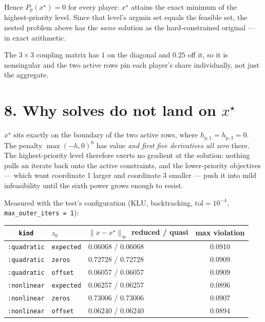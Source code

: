 \documentclass[11pt]{article}
\begin{document}
Hence \(P_p(x^\star) = 0\) for every player: \(x^\star\) attains the exact minimum of the
highest-priority level. Since that level's argmin set equals the feasible set, the nested
problem above has the \emph{same} solution as the hard-constrained original --- in exact
arithmetic.

The \(3\times 3\) coupling matrix has \(1\) on the diagonal and \(0.25\) off it, so it is
nonsingular and the two active rows pin each player's share individually, not just the
aggregate.

\section*{8. Why solves do not land on \texorpdfstring{\(x^\star\)}{x*}}

\(x^\star\) sits exactly on the boundary of the two active rows, where
\(h_{p,1} = h_{p,3} = 0\). The penalty \(\max(-h,0)^6\) has value \emph{and first five
derivatives all zero} there. The highest-priority level therefore exerts no gradient at the
solution: nothing pulls an iterate back onto the active constraints, and the lower-priority
objectives --- which want coordinate 1 larger and coordinate 3 smaller --- push it into mild
infeasibility until the sixth power grows enough to resist.

Measured with the test's configuration (KLU, backtracking, \(\text{tol} = 10^{-4}\),
\texttt{max\_outer\_iters = 1}):

\begin{center}
\begin{tabular}{cllc}
  \toprule
  \texttt{kind} & \(z_0\) & \(\lVert x - x^\star\rVert_\infty\) reduced / quasi & max violation \\
  \midrule
  \texttt{:quadratic} & \texttt{expected} & 0.06068 / 0.06068 & 0.0910 \\
  \texttt{:quadratic} & \texttt{zeros}    & 0.72728 / 0.72728 & 0.0909 \\
  \texttt{:quadratic} & \texttt{offset}   & 0.06057 / 0.06057 & 0.0909 \\
  \texttt{:nonlinear} & \texttt{expected} & 0.06257 / 0.06257 & 0.0896 \\
  \texttt{:nonlinear} & \texttt{zeros}    & 0.73006 / 0.73006 & 0.0907 \\
  \texttt{:nonlinear} & \texttt{offset}   & 0.06240 / 0.06240 & 0.0894 \\
  \bottomrule
\end{tabular}
\end{center}
\end{document}
